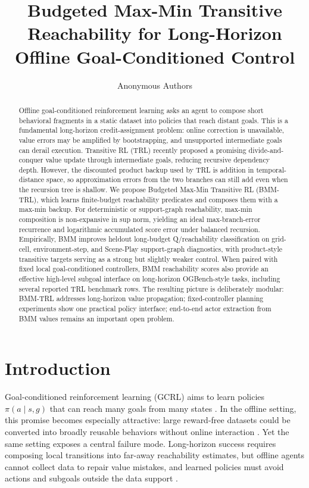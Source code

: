 \documentclass[11pt]{article}
\title{Budgeted Max-Min Transitive Reachability for Long-Horizon Offline Goal-Conditioned Control}
\author{Anonymous Authors}
\date{}
\begin{document}
\maketitle

\begin{abstract}
Offline goal-conditioned reinforcement learning asks an agent to compose short
behavioral fragments in a static dataset into policies that reach distant goals.
This is a fundamental long-horizon credit-assignment problem: online correction
is unavailable, value errors may be amplified by bootstrapping, and unsupported
intermediate goals can derail execution. Transitive RL (TRL) recently proposed a
promising divide-and-conquer value update through intermediate goals, reducing
recursive dependency depth. However, the discounted product backup used by TRL is
addition in temporal-distance space, so approximation errors from the two
branches can still add even when the recursion tree is shallow. We propose
Budgeted Max-Min Transitive RL (BMM-TRL), which learns finite-budget
reachability predicates and composes them with a max-min backup. For deterministic
or support-graph reachability, max-min composition is non-expansive in sup norm,
yielding an ideal max-branch-error recurrence and logarithmic accumulated score
error under balanced recursion. Empirically, BMM improves heldout long-budget
Q/reachability classification on grid-cell, environment-step, and Scene-Play
support-graph diagnostics, with product-style transitive targets serving as a
strong but slightly weaker control. When paired with fixed local goal-conditioned
controllers, BMM reachability scores also provide an effective high-level
subgoal interface on long-horizon OGBench-style tasks, including several
reported TRL benchmark rows. The resulting picture is deliberately modular:
BMM-TRL addresses long-horizon value propagation; fixed-controller planning
experiments show one practical policy interface; end-to-end actor extraction from
BMM values remains an important open problem.
\end{abstract}

\section{Introduction}

Goal-conditioned reinforcement learning (GCRL) aims to learn policies
$\pi(a\mid s,g)$ that can reach many goals from many states
\citep{kaelbling1993learning,schaul2015uvfa,andrychowicz2017her}. In the offline
setting, this promise becomes especially attractive: large reward-free datasets
could be converted into broadly reusable behaviors without online interaction
\citep{fu2020d4rl,park2024ogbench}. Yet the same setting exposes a central
failure mode. Long-horizon success requires composing local transitions into
far-away reachability estimates, but offline agents cannot collect data to repair
value mistakes, and learned policies must avoid actions and subgoals outside the
data support \citep{kumar2020cql,kostrikov2022iql}.
\end{document}
